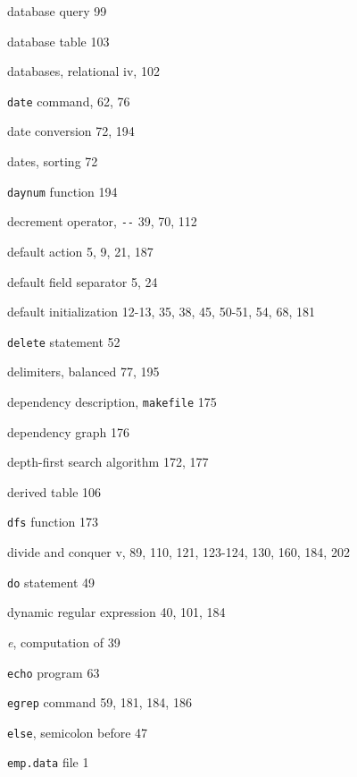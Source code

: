 \begin{multicols}{3}
\hangindent=4pc  database query 99

\hangindent=4pc  database table 103

\hangindent=4pc  databases, relational iv, 102

\hangindent=4pc  \verb'date' command, 62, 76

\hangindent=4pc  date conversion 72, 194

\hangindent=4pc  dates, sorting 72

\hangindent=4pc  \verb'daynum' function 194

\hangindent=4pc  decrement operator, \verb'--' 39, 70, 112

\hangindent=4pc  default action 5, 9, 21, 187

\hangindent=4pc  default field separator 5, 24

\hangindent=4pc  default initialization 12-13, 35, 38, 45, 50-51, 54, 68, 181

\hangindent=4pc  \verb'delete' statement 52

\hangindent=4pc  delimiters, balanced 77, 195

\hangindent=4pc  dependency description, \verb'makefile' 175

\hangindent=4pc  dependency graph 176

\hangindent=4pc  depth-first search algorithm 172, 177

\hangindent=4pc  derived table 106

\hangindent=4pc  \verb'dfs' function 173

\hangindent=4pc  divide and conquer v, 89, 110, 121, 123-124, 130, 160, 184, 202

\hangindent=4pc  \verb'do' statement 49

\hangindent=4pc  dynamic regular expression 40, 101, 184

\hangindent=4pc  \textit{e}, computation of 39

\hangindent=4pc  \verb'echo' program 63

\hangindent=4pc  \verb'egrep' command 59, 181, 184, 186

\hangindent=4pc  \verb'else', semicolon before 47

\hangindent=4pc  \verb'emp.data' file 1


\end{multicols}
